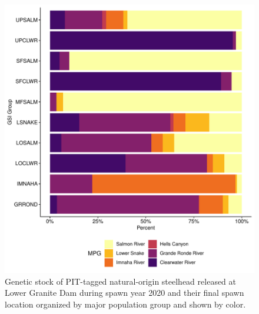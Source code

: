 \documentclass[11pt,a4paper,]{article}
\begin{document}
\begin{figure}
\centering
\includegraphics{Kelt_Summary_files/figure-latex/sum-gsi-mpg-1.pdf}
\caption{\label{fig:sum-gsi-mpg}Genetic stock of PIT-tagged natural-origin steelhead released at Lower Granite Dam during spawn year 2020 and their final spawn location organized by major population group and shown by color.}
\end{figure}
\end{document}
